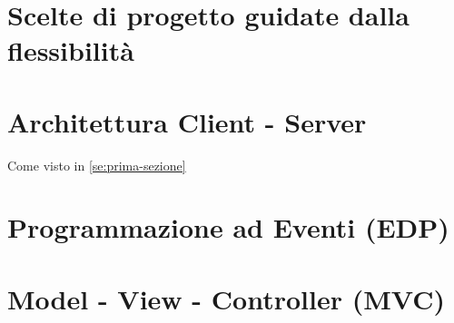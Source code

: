 
\section{Scelte di progetto guidate dalla flessibilità}

\section{Architettura Client - Server}
Come visto in \ref{se:prima-sezione}

\section{Programmazione ad Eventi (EDP)}

\section{Model - View - Controller (MVC)}



